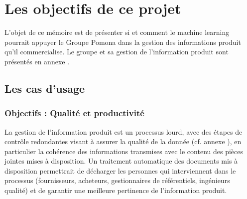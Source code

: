 \part{Les objectifs de ce projet}
    
    {\large
    L'objet de ce mémoire est de présenter si et comment le machine learning pourrait appuyer le Groupe Pomona dans la gestion des informations produit qu'il commercialise.
    Le groupe et sa gestion de l'information produit sont présentés en annexe .
    }

    \chapter{Les cas d'usage}

        \section{Objectifs : Qualité et productivité}

        La gestion de l'information produit est un processus lourd, avec des étapes de contrôle redondantes visant à assurer la qualité de la donnée (cf. annexe ), en particulier la cohérence des informations transmises avec le contenu des pièces jointes mises à disposition.
        Un traitement automatique des documents mis à disposition permettrait de décharger les personnes qui interviennent dans le processus (fournisseurs, acheteurs, gestionnaires de référentiels, ingénieurs qualité) et de garantir une meilleure pertinence de l'information produit.

